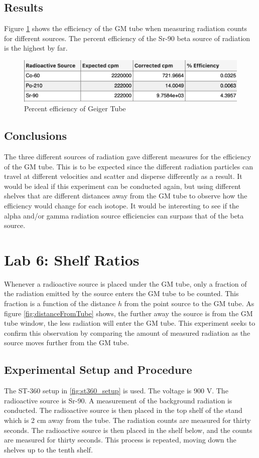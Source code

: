 \documentclass[reprint,amsmath,amssymb,aps,prl]{revtex4-2}
\begin{document}
\subsection{Results}
Figure \ref{fig:lab5_table} shows the efficiency of the GM tube when measuring radiation counts for different sources. The percent efficiency of the Sr-90 beta source of radiation is the highest by far.  
\begin{figure}
    \centering
    \includegraphics[width = \columnwidth]{lab5_table.png}
    \caption{Percent efficiency of Geiger Tube}
    \label{fig:lab5_table}
\end{figure}

\subsection{Conclusions}
The three different sources of radiation gave different measures for the efficiency of the GM tube. This is to be expected since the different radiation particles can travel at different velocities and scatter and disperse differently as a result. It would be ideal if this experiment can be conducted again, but using different shelves that are different distances away from the GM tube to observe how the efficiency would change for each isotope. It would be interesting to see if the alpha and/or gamma radiation source efficiencies can surpass that of the beta source.

\section{Lab 6: Shelf Ratios}
Whenever a radioactive source is placed under the GM tube, only a fraction of the radiation emitted by the source enters the GM tube to be counted. This fraction is a function of the distance $h$ from the point source to the GM tube. As figure \ref{fig:distanceFromTube} shows, the further away the source is from the GM tube window, the less radiation will enter the GM tube. This experiment seeks to confirm this observation by comparing the amount of measured radiation as the source moves further from the GM tube.

\subsection{Experimental Setup and Procedure}
The ST-360 setup in \ref{fig:st360_setup} is used. The voltage is 900 V. The radioactive source is Sr-90. A measurement of the background radiation is conducted. The radioactive source is then placed in the top shelf of the stand which is 2 cm away from the tube. The radiation counts are measured for thirty seconds. The radioactive source is then placed in the shelf below, and the counts are measured for thirty seconds. This process is repeated, moving down the shelves up to the tenth shelf. 
\end{document}

